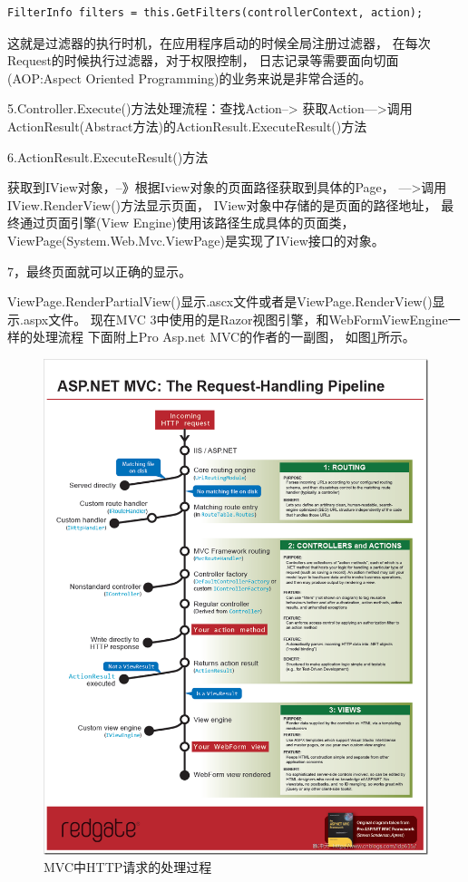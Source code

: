 \documentclass{book}
\begin{document}
\begin{lstlisting}[language={[Sharp]C}]
FilterInfo filters = this.GetFilters(controllerContext, action);
\end{lstlisting}

这就是过滤器的执行时机，在应用程序启动的时候全局注册过滤器，
在每次Request的时候执行过滤器，对于权限控制，
日志记录等需要面向切面(AOP:Aspect Oriented Programming)的业务来说是非常合适的。

5.Controller.Execute()方法处理流程：查找Action-->
获取Action--->调用ActionResult(Abstract方法)的ActionResult.ExecuteResult()方法

6.ActionResult.ExecuteResult()方法

获取到IView对象，--》根据Iview对象的页面路径获取到具体的Page，
--->调用IView.RenderView()方法显示页面，
IView对象中存储的是页面的路径地址，
最终通过页面引擎(View Engine)使用该路径生成具体的页面类，
ViewPage(System.Web.Mvc.ViewPage)是实现了IView接口的对象。

7，最终页面就可以正确的显示。

ViewPage.RenderPartialView()显示.ascx文件或者是ViewPage.RenderView()显示.aspx文件。
现在MVC 3中使用的是Razor视图引擎，和WebFormViewEngine一样的处理流程
下面附上Pro Asp.net MVC的作者的一副图，
如图\ref{fig:ASP.NETMVCRequestHandlingPipelinethumb}所示。

\begin{figure}[htbp]
	\centering
	\includegraphics[scale=0.6]{ASP.NETMVCRequestHandlingPipelinethumb.png}
	\caption{MVC中HTTP请求的处理过程}
	\label{fig:ASP.NETMVCRequestHandlingPipelinethumb}
\end{figure}
\end{document}
